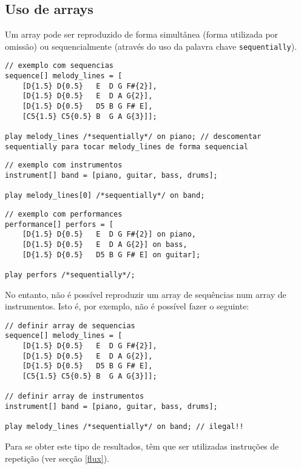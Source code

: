 \documentclass{article}
\begin{document}
\subsection{Uso de arrays}
Um array pode ser reproduzido de forma simultânea (forma utilizada por omissão) ou sequencialmente (através do uso da palavra chave \texttt{sequentially}).

\begin{lstlisting} 
// exemplo com sequencias
sequence[] melody_lines = [
    [D{1.5} D{0.5}   E  D G F#{2}], 
    [D{1.5} D{0.5}   E  D A G{2}],
    [D{1.5} D{0.5}   D5 B G F# E],
    [C5{1.5} C5{0.5} B  G A G{3}]];

play melody_lines /*sequentially*/ on piano; // descomentar sequentially para tocar melody_lines de forma sequencial
\end{lstlisting}

\begin{lstlisting} 
// exemplo com instrumentos
instrument[] band = [piano, guitar, bass, drums];

play melody_lines[0] /*sequentially*/ on band;
\end{lstlisting}

\begin{lstlisting} 
// exemplo com performances
performance[] perfors = [
    [D{1.5} D{0.5}   E  D G F#{2}] on piano, 
    [D{1.5} D{0.5}   E  D A G{2}] on bass,
    [D{1.5} D{0.5}   D5 B G F# E] on guitar];
    
play perfors /*sequentially*/;
\end{lstlisting}
No entanto, não é possível reproduzir um array de sequências num array de instrumentos. Isto é, por exemplo, não é possível fazer o seguinte:

\begin{lstlisting} 
// definir array de sequencias
sequence[] melody_lines = [
    [D{1.5} D{0.5}   E  D G F#{2}], 
    [D{1.5} D{0.5}   E  D A G{2}],
    [D{1.5} D{0.5}   D5 B G F# E],
    [C5{1.5} C5{0.5} B  G A G{3}]];

// definir array de instrumentos
instrument[] band = [piano, guitar, bass, drums];

play melody_lines /*sequentially*/ on band; // ilegal!!
\end{lstlisting}

Para se obter este tipo de resultados, têm que ser utilizadas instruções de repetição (ver secção \ref{flux}).

\end{document}
